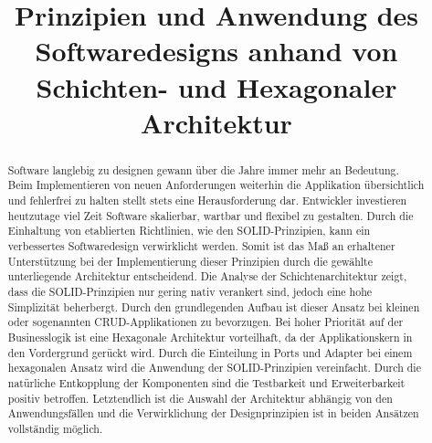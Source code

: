 \documentclass[conference]{IEEEtran}
\begin{document}

\title{Prinzipien und Anwendung des Softwaredesigns anhand von Schichten- und Hexagonaler Architektur}

\author{
}

\maketitle



\begin{abstract}

Software langlebig zu designen gewann über die Jahre immer mehr an Bedeutung. Beim Implementieren von neuen Anforderungen weiterhin die Applikation übersichtlich und fehlerfrei zu halten stellt  stets eine Herausforderung dar. Entwickler investieren heutzutage viel Zeit Software skalierbar, wartbar und flexibel zu gestalten. Durch die Einhaltung von etablierten Richtlinien, wie den SOLID-Prinzipien, kann ein verbessertes Softwaredesign verwirklicht werden. Somit ist das Maß an erhaltener Unterstützung bei der Implementierung dieser Prinzipien durch die gewählte unterliegende Architektur entscheidend. Die Analyse der Schichtenarchitektur zeigt, dass die SOLID-Prinzipien nur gering nativ verankert sind, jedoch eine hohe Simplizität beherbergt. Durch den grundlegenden Aufbau ist dieser Ansatz bei kleinen oder sogenannten CRUD-Applikationen zu bevorzugen. Bei hoher Priorität auf der Businesslogik ist eine Hexagonale Architektur vorteilhaft, da der Applikationskern in den Vordergrund gerückt wird. Durch die Einteilung in Ports und Adapter bei einem hexagonalen Ansatz wird die Anwendung der SOLID-Prinzipien vereinfacht. Durch die natürliche Entkopplung der Komponenten sind die Testbarkeit und Erweiterbarkeit positiv betroffen. Letztendlich ist die Auswahl der Architektur abhängig von den Anwendungsfällen und die Verwirklichung der Designprinzipien ist in beiden Ansätzen vollständig möglich. 

\end{abstract}
\end{document}
